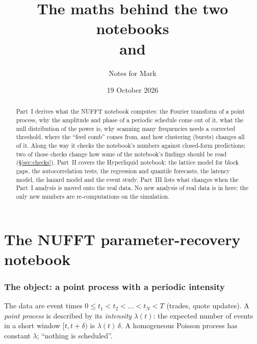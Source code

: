 \documentclass[11pt,a4paper]{article}
\title{\textbf{The maths behind the two notebooks}\\[4pt]
\large \code{nufft_parameter_recovery.ipynb} and \code{hyperliquid_research.ipynb}}
\author{Notes for Mark}
\date{19 October 2026}
\newcommand{\code}[1]{\texttt{\detokenize{#1}}}
\begin{document}
\maketitle

\begin{abstract}
\noindent Part~I derives what the NUFFT notebook computes: the Fourier transform of a point process, why the
amplitude and phase of a periodic schedule come out of it, what the null distribution of the power is, why
scanning many frequencies needs a corrected threshold, where the ``feed comb'' comes from, and how clustering
(bursts) changes all of it. Along the way it checks the notebook's numbers against closed-form predictions; two of
those checks change how some of the notebook's findings should be read (\S\ref{sec:checks}).
Part~II covers the Hyperliquid notebook: the lattice model for block gaps, the autocorrelation tests, the
regression and quantile forecasts, the latency model, the hazard model and the event study.
Part~III lists what changes when the Part~I analysis is moved onto the real \code{market_data_v2} data. No new analysis of real data is
in here; the only new numbers are re-computations on the simulation.
\end{abstract}

\tableofcontents
\newpage

\part{The NUFFT parameter-recovery notebook}

\section{The object: a point process with a periodic intensity}

The data are event times $0\le t_1<t_2<\dots<t_N<T$ (trades, quote updates). A \emph{point process} is described by
its \emph{intensity} $\lambda(t)$: the expected number of events in a short window $[t,t+\delta)$ is $\lambda(t)\,\delta$.
A homogeneous Poisson process has constant $\lambda$; ``nothing is scheduled''.
\end{document}
